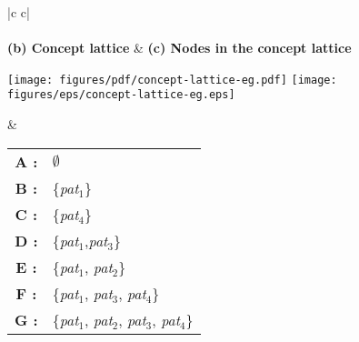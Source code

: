 \begin{figure}[ht!]
\begin{center}
\begin{tabular}{|c c|}
\hline
%
\\
%
\\
%
\textbf{(b) Concept lattice} &
\textbf{(c) Nodes in the concept lattice}\\
%
\begin{minipage}{2in}
\begin{center}
\ifpdf
\texttt{[image: figures/pdf/concept-lattice-eg.pdf]}
\else
\texttt{[image: figures/eps/concept-lattice-eg.eps]}
\fi
\end{center}
\end{minipage} &
\begin{minipage}{3in}
\begin{tabular}{c l}
\textbf{A :} & \pair{\{\code{api$_1$}, \code{api$_2$}, \code{api$_3$}, \code{api$_4$}\}}
                    {$\emptyset$}\\ 
\textbf{B :} & \pair{\{\code{api$_1$}, \code{api$_2$}, \code{api$_3$}\}}
                    {\{\textit{pat$_1$}\}}\\
\textbf{C :} & \pair{\{\code{api$_3$}, \code{api$_4$}\}}
                    {\{\textit{pat$_4$}\}}\\
\textbf{D :} & \pair{\{\code{api$_2$}, \code{api$_3$}\}}
                    {\{\textit{pat$_1$},\textit{pat$_3$}\}}\\
\textbf{E :} & \pair{\{\code{api$_1$}, \code{api$_2$}\}}
                    {\{\textit{pat$_1$}, \textit{pat$_2$}\}}\\
\textbf{F :} & \pair{\{\code{api$_3$}\}}
                    {\{\textit{pat$_1$}, \textit{pat$_3$}, \textit{pat$_4$}\}}\\
\textbf{G :} & \pair{$\emptyset$}
                    {\{\textit{pat$_1$}, \textit{pat$_2$}, \textit{pat$_3$}, \textit{pat$_4$}\}}
\end{tabular}
\end{minipage}\\\hline
\end{tabular}
\end{center}
\end{figure}

